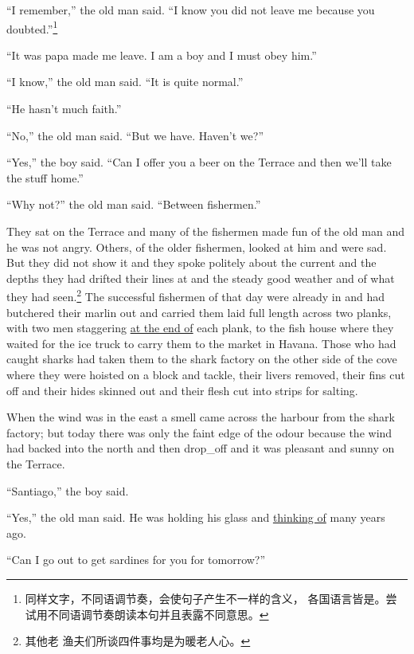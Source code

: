 \documentclass[fontset=ubuntu]{ctexrep}
\newlength{\drop}%
\begin{document}
``I remember,'' the old man said. ``I know you did not leave me because you
\gls{doubted}.''\footnote{同样文字，不同语调节奏，会使句子产生不一样的含义，
  各国语言皆是。尝试用不同语调节奏朗读本句并且表露不同意思。}

``It was papa made me leave. I am a boy and I must \gls{obey} him.''

``I know,'' the old man said. ``It is quite normal.''

``He hasn't much \gls{faith}.''

``No,'' the old man said. ``But we have. Haven't we?''

``Yes,'' the boy said. ``Can I offer you a beer on the \gls{Terrace} and then we'll take the \gls{stuff} home.''

``Why not?'' the old man said. ``Between fishermen.''

They sat on the Terrace and many of the fishermen made fun of the old man
and he was not angry. Others, of the older fishermen, looked at him and were
sad. But they did not show it and they spoke \gls{politely} about the
\gls{current} and the \glspl{depth} they had \gls{drifted} their lines at
and the \gls{steady} good weather and of what they had seen.\footnote{其他老
  渔夫们所谈四件事均是为暖老人心。} The successful fishermen of that day
were already in and had \gls{butchered} their \gls{marlin} out and carried
them \gls{laid} full length across two \glspl{plank}, with two men
\gls{staggering} \uline{at the end of} each plank, to the fish house where
they waited for the ice truck to carry them to the market in Havana. Those
who had caught \glspl{shark} had taken them to the shark factory on
the other side of the \gls{cove} where they were \gls{hoisted} on a
\gls{block} and \gls{tackle}, their \glspl{liver} removed, their \glspl{fin}
cut off and their \glspl{hide} \gls{skinned} out and their \gls{flesh} cut
into \glspl{strip} for salting.

When the wind was in the east a smell came across the \gls{harbour} from the
shark factory; but today there was only the \gls{faint} \gls{edge} of the
\gls{odour} because the wind had backed into the north and then \gls{drop_off}
and it was \gls{pleasant} and sunny on the Terrace.

``Santiago,'' the boy said.

``Yes,'' the old man said. He was holding his glass and \uline{thinking of}
many years ago.

``Can I go out to get \glspl{sardine} for you for tomorrow?''
\end{document}
